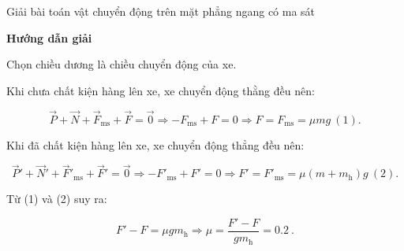 \begin{dang}{Giải bài toán vật chuyển động trên mặt phẳng ngang có ma sát}
{	}
	
	{	\begin{center}
			\textbf{Hướng dẫn giải}
		\end{center}
		
		Chọn chiều dương là chiều chuyển động của xe.
		
		Khi chưa chất kiện hàng lên xe, xe chuyển động thằng đều nên:
		
		$$\vec P + \vec N + \vec F_\text{ms} + \vec F = \vec 0 \Rightarrow - F_\text{ms} + F =0 \Rightarrow F =F_\text{ms} = \mu mg\ (1).$$
		
		Khi đã chất kiện hàng lên xe, xe chuyển động thẳng đều nên:	
		
		$$\vec P' + \vec N' + \vec F'_\text{ms} + \vec F' = \vec 0 \Rightarrow - F'_\text{ms} + F' =0 \Rightarrow F' =F'_\text{ms} = \mu (m+m_\text{h})g\ (2).$$
		
		Từ (1) và (2) suy ra: 
		
		$$F' - F = \mu g m_\text{h} \Rightarrow \mu =\dfrac{F'-F}{gm_\text{h}} = \SI{0,2}{}.$$
		
		
	}
	
\end{dang}